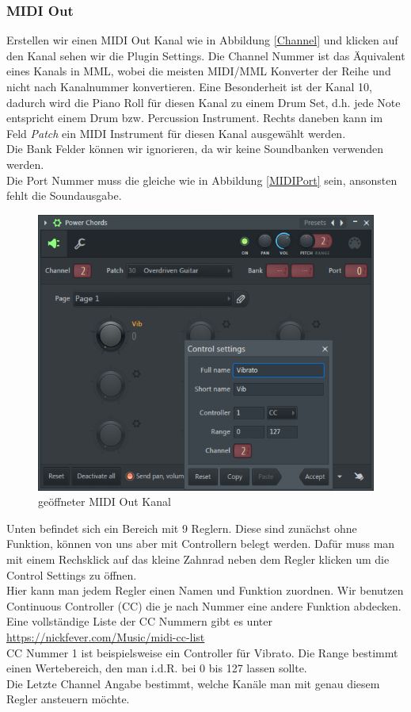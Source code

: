 \bigskip

\subsubsection*{MIDI Out}

Erstellen wir einen MIDI Out Kanal wie in Abbildung \ref{Channel} und klicken auf den Kanal sehen wir die Plugin Settings. Die Channel Nummer ist das Äquivalent eines Kanals in MML, wobei die meisten MIDI/MML Konverter der Reihe und nicht nach Kanalnummer konvertieren. Eine Besonderheit ist der Kanal 10, dadurch wird die Piano Roll für diesen Kanal zu einem Drum Set, d.h. jede Note entspricht einem Drum bzw. Percussion Instrument. Rechts daneben kann im Feld \textit{Patch} ein MIDI Instrument für diesen Kanal ausgewählt werden. \\
Die Bank Felder können wir ignorieren, da wir keine Soundbanken verwenden werden. \\
Die Port Nummer muss die gleiche wie in Abbildung \ref{MIDIPort} sein, ansonsten fehlt die Soundausgabe.

\begin{figure}[htbp] \centering
	\includegraphics[width=.75\linewidth]{images/MIDIOut.png}
	\caption{geöffneter MIDI Out Kanal}
	\label{MIDIOut}
\end{figure}

Unten befindet sich ein Bereich mit 9 Reglern. Diese sind zunächst ohne Funktion, können von uns aber mit Controllern belegt werden. Dafür muss man mit einem Rechsklick auf das kleine Zahnrad neben dem Regler klicken um die Control Settings zu öffnen. \\
Hier kann man jedem Regler einen Namen und Funktion zuordnen. Wir benutzen Continuous Controller (CC) die je nach Nummer eine andere Funktion abdecken. Eine vollständige Liste der CC Nummern gibt es unter \href{https://nickfever.com/Music/midi-cc-list}{https://nickfever.com/Music/midi-cc-list} \\
CC Nummer 1 ist beispielsweise ein Controller für Vibrato. Die Range bestimmt einen Wertebereich, den man i.d.R. bei 0 bis 127 lassen sollte. \\
Die Letzte Channel Angabe bestimmt, welche Kanäle man mit genau diesem Regler ansteuern möchte.

